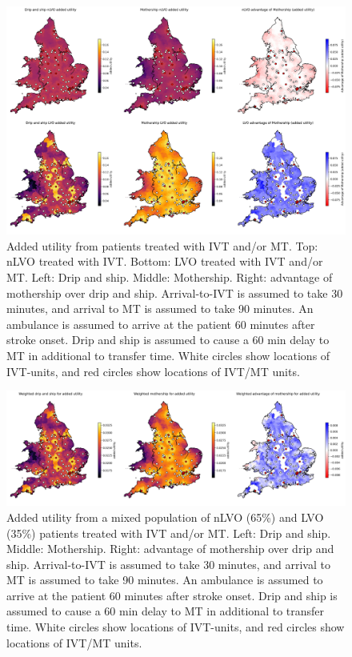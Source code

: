 \begin{figure}
\centering
\includegraphics[width=\textwidth]{./maps/added_utility_six_in_one}
\caption{Added utility from patients treated with IVT and/or MT. Top: nLVO treated with IVT. Bottom: LVO treated with IVT and/or MT. Left: Drip and ship. Middle: Mothership. Right: advantage of mothership over drip and ship. Arrival-to-IVT is assumed to take 30 minutes, and arrival to MT is assumed to take 90 minutes. An ambulance is assumed to arrive at the patient 60 minutes after stroke onset. Drip and ship is assumed to cause a 60 min delay to MT in additional to transfer time. White circles show locations of IVT-units, and red circles show locations of IVT/MT units.}
\label{fig:added_utility_six_in_one}
\end{figure}

\begin{figure}
\centering
\includegraphics[width=\textwidth]{./maps/added_utility_weighted_results}
\caption{Added utility from a mixed population of nLVO (65\%) and LVO (35\%) patients treated with IVT and/or MT. Left: Drip and ship. Middle: Mothership. Right: advantage of mothership over drip and ship. Arrival-to-IVT is assumed to take 30 minutes, and arrival to MT is assumed to take 90 minutes. An ambulance is assumed to arrive at the patient 60 minutes after stroke onset. Drip and ship is assumed to cause a 60 min delay to MT in additional to transfer time. White circles show locations of IVT-units, and red circles show locations of IVT/MT units.}
\label{fig:added_utility_net}
\end{figure}
